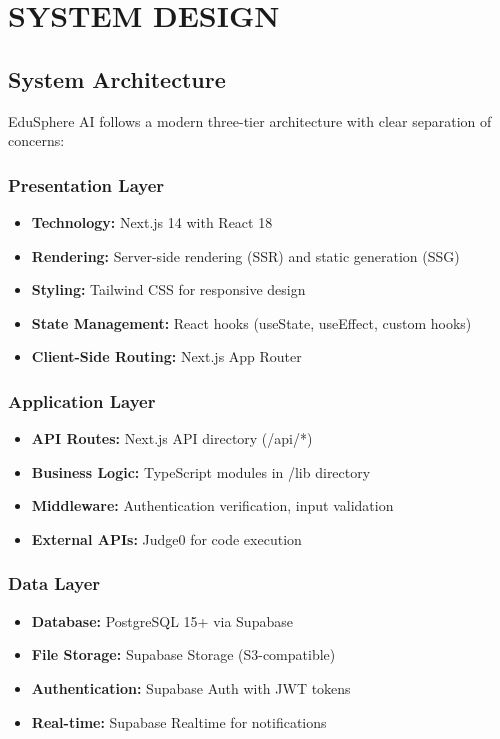 \chapter{SYSTEM DESIGN}

\section{System Architecture}

EduSphere AI follows a modern three-tier architecture with clear separation of concerns:

\subsection{Presentation Layer}
\begin{itemize}
\item \textbf{Technology:} Next.js 14 with React 18
\item \textbf{Rendering:} Server-side rendering (SSR) and static generation (SSG)
\item \textbf{Styling:} Tailwind CSS for responsive design
\item \textbf{State Management:} React hooks (useState, useEffect, custom hooks)
\item \textbf{Client-Side Routing:} Next.js App Router
\end{itemize}

\subsection{Application Layer}
\begin{itemize}
\item \textbf{API Routes:} Next.js API directory (/api/*)
\item \textbf{Business Logic:} TypeScript modules in /lib directory
\item \textbf{Middleware:} Authentication verification, input validation
\item \textbf{External APIs:} Judge0 for code execution
\end{itemize}

\subsection{Data Layer}
\begin{itemize}
\item \textbf{Database:} PostgreSQL 15+ via Supabase
\item \textbf{File Storage:} Supabase Storage (S3-compatible)
\item \textbf{Authentication:} Supabase Auth with JWT tokens
\item \textbf{Real-time:} Supabase Realtime for notifications
\end{itemize}

